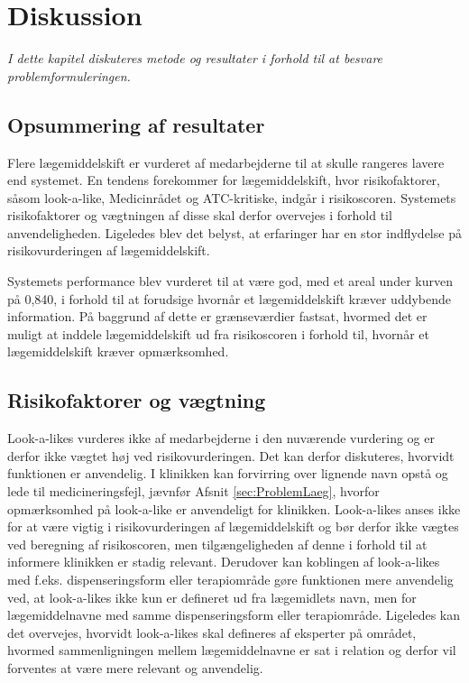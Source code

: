 \chapter{Diskussion}
\textit{I dette kapitel diskuteres metode og resultater i forhold til at besvare problemformuleringen.}

\section{Opsummering af resultater}
Flere lægemiddelskift er vurderet af medarbejderne til at skulle rangeres lavere end systemet. En tendens forekommer for lægemiddelskift, hvor risikofaktorer, såsom look-a-like, Medicinrådet og ATC-kritiske, indgår i risikoscoren. Systemets risikofaktorer og vægtningen af disse skal derfor overvejes i forhold til anvendeligheden. Ligeledes blev det belyst, at erfaringer har en stor indflydelse på risikovurderingen af lægemiddelskift. %

Systemets performance blev vurderet til at være god, med et areal under kurven på 0,840, i forhold til at forudsige hvornår et lægemiddelskift kræver uddybende information. På baggrund af dette er grænseværdier fastsat, hvormed det er muligt at inddele lægemiddelskift ud fra risikoscoren i forhold til, hvornår et lægemiddelskift kræver opmærksomhed. %



\section{Risikofaktorer og vægtning}
Look-a-likes vurderes ikke af medarbejderne i den nuværende vurdering og er derfor ikke vægtet høj ved risikovurderingen. Det kan derfor diskuteres, hvorvidt funktionen er anvendelig. I klinikken kan forvirring over lignende navn opstå og lede til medicineringsfejl, jævnfør Afsnit \ref{sec:ProblemLaeg}, hvorfor opmærksomhed på look-a-like er anvendeligt for klinikken. Look-a-likes anses ikke for at være vigtig i risikovurderingen af lægemiddelskift og bør derfor ikke vægtes ved beregning af risikoscoren, men tilgængeligheden af denne i forhold til at informere klinikken er stadig relevant.
Derudover kan koblingen af look-a-likes med f.eks. dispenseringsform eller terapiområde gøre funktionen mere anvendelig ved, at look-a-likes ikke kun er defineret ud fra lægemidlets navn, men for lægemiddelnavne med samme dispenseringsform eller terapiområde. Ligeledes kan det overvejes, hvorvidt look-a-likes skal defineres af eksperter på området, hvormed sammenligningen mellem lægemiddelnavne er sat i relation og derfor vil forventes at være mere relevant og anvendelig.

